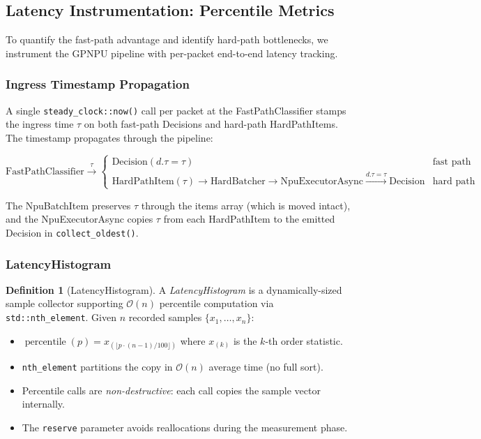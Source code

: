\documentclass[11pt,a4paper,twoside]{article}
\theoremstyle{definition}
\newtheorem{definition}{Definition}[section]
\theoremstyle{remark}
\newcommand{\BigO}{\mathcal{O}}
\begin{document}
\subsection{Latency Instrumentation: Percentile Metrics}
\label{sec:gpnpu-latency}

To quantify the fast-path advantage and identify hard-path bottlenecks, we instrument the GPNPU pipeline with per-packet end-to-end latency tracking.

\subsubsection{Ingress Timestamp Propagation}

A single \texttt{steady\_clock::now()} call per packet at the FastPathClassifier stamps the ingress time $\tau$ on both fast-path Decisions and hard-path HardPathItems. The timestamp propagates through the pipeline:

\begin{equation}
\text{FastPathClassifier} \xrightarrow{\tau} \begin{cases}
  \text{Decision}(d.\tau = \tau) & \text{fast path} \\
  \text{HardPathItem}(\tau) \to \text{HardBatcher} \to \text{NpuExecutorAsync} \xrightarrow{d.\tau = \tau} \text{Decision} & \text{hard path}
\end{cases}
\end{equation}

The NpuBatchItem preserves $\tau$ through the items array (which is moved intact), and the NpuExecutorAsync copies $\tau$ from each HardPathItem to the emitted Decision in \texttt{collect\_oldest()}.

\subsubsection{LatencyHistogram}

\begin{definition}[LatencyHistogram]
A \emph{LatencyHistogram} is a dynamically-sized sample collector supporting $\BigO(n)$ percentile computation via \texttt{std::nth\_element}. Given $n$ recorded samples $\{x_1, \ldots, x_n\}$:
\begin{itemize}[leftmargin=*]
  \item $\operatorname{percentile}(p) = x_{(\lfloor p \cdot (n-1) / 100 \rfloor)}$ where $x_{(k)}$ is the $k$-th order statistic.
  \item \texttt{nth\_element} partitions the copy in $\BigO(n)$ average time (no full sort).
  \item Percentile calls are \emph{non-destructive}: each call copies the sample vector internally.
  \item The \texttt{reserve} parameter avoids reallocations during the measurement phase.
\end{itemize}
\end{definition}
\end{document}
